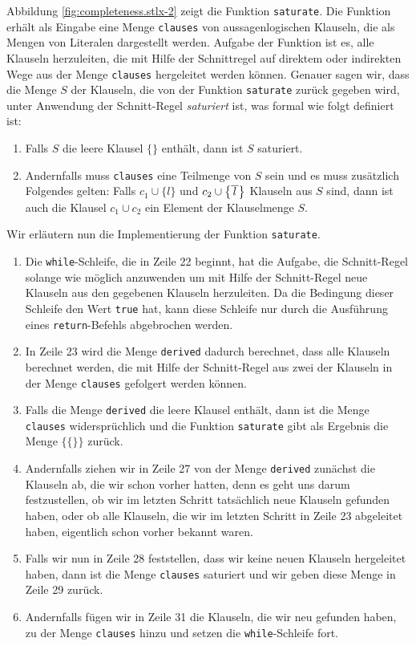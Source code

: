 Abbildung \ref{fig:completeness.stlx-2} zeigt die Funktion \texttt{saturate}.  Die Funktion erh\"{a}lt
als Eingabe eine Menge \texttt{clauses} von aussagenlogischen Klauseln, die als Mengen von Literalen
dargestellt werden.  Aufgabe der Funktion ist es, alle Klauseln herzuleiten, die mit Hilfe der
Schnittregel auf direktem oder indirekten Wege aus der Menge \texttt{clauses} hergeleitet werden
k\"{o}nnen.  Genauer sagen wir, dass die Menge $S$ der Klauseln, die von der Funktion \texttt{saturate}
zur\"{u}ck gegeben wird, unter Anwendung der Schnitt-Regel \emph{saturiert} ist, was formal wie folgt
definiert ist:
\begin{enumerate}
\item Falls $S$ die leere Klausel $\{\}$ enth\"{a}lt, dann ist $S$ saturiert.
\item Andernfalls muss \texttt{clauses} eine Teilmenge von $S$ sein und es muss zus\"{a}tzlich Folgendes
      gelten: Falls $c_1 \cup \{ l \}$ und  $c_2 \cup \bigl\{ \overline{\,l\,} \bigr\}$ Klauseln aus $S$
      sind, dann ist auch die Klausel $c_1 \cup c_2$ ein Element der Klauselmenge $S$.
\end{enumerate}
Wir erl\"{a}utern nun die Implementierung der Funktion \texttt{saturate}.
\begin{enumerate}
\item Die \texttt{while}-Schleife, die in Zeile 22 beginnt, hat die Aufgabe, die Schnitt-Regel
      solange wie m\"{o}glich anzuwenden um mit Hilfe der Schnitt-Regel neue Klauseln aus den gegebenen
      Klauseln herzuleiten.  Da die Bedingung dieser Schleife den Wert \texttt{true} hat, kann diese
      Schleife nur durch die Ausf\"{u}hrung eines \texttt{return}-Befehls abgebrochen werden.
\item In Zeile 23 wird die Menge \texttt{derived} dadurch berechnet, dass alle Klauseln berechnet
      werden, die mit Hilfe der Schnitt-Regel aus zwei der Klauseln in der Menge \texttt{clauses} 
      gefolgert werden k\"{o}nnen.
\item Falls die Menge \texttt{derived} die leere Klausel enth\"{a}lt, dann ist die Menge
      \texttt{clauses} widerspr\"{u}chlich und die Funktion \texttt{saturate} gibt als Ergebnis die
      Menge $\bigl\{ \{\} \bigr\}$ zur\"{u}ck.
\item Andernfalls ziehen wir in Zeile 27 von der Menge \texttt{derived} zun\"{a}chst die Klauseln ab, die wir schon
      vorher hatten, denn es geht uns darum festzustellen, ob wir im letzten Schritt tats\"{a}chlich
      neue Klauseln gefunden haben, oder ob alle Klauseln, die wir im letzten Schritt in Zeile 23
      abgeleitet haben, eigentlich schon vorher  bekannt  waren.
\item Falls wir nun in Zeile 28 feststellen, dass wir keine neuen Klauseln hergeleitet haben,
      dann ist die Menge \texttt{clauses} saturiert und wir geben diese Menge in Zeile 29 zur\"{u}ck.
\item Andernfalls f\"{u}gen wir in Zeile 31 die Klauseln, die wir neu gefunden haben, zu der Menge
      \texttt{clauses} hinzu und setzen die \texttt{while}-Schleife fort.
\end{enumerate}
